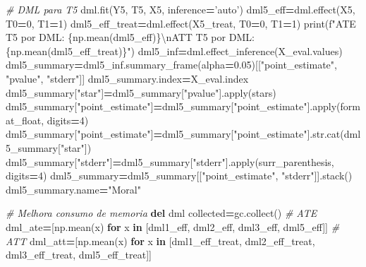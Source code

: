 \documentclass[
]{article}
\newenvironment{Shaded}{\begin{snugshade}}{\end{snugshade}}
\newcommand{\BuiltInTok}[1]{#1}
\newcommand{\CharTok}[1]{\textcolor[rgb]{0.31,0.60,0.02}{#1}}
\newcommand{\CommentTok}[1]{\textcolor[rgb]{0.56,0.35,0.01}{\textit{#1}}}
\newcommand{\ControlFlowTok}[1]{\textcolor[rgb]{0.13,0.29,0.53}{\textbf{#1}}}
\newcommand{\DecValTok}[1]{\textcolor[rgb]{0.00,0.00,0.81}{#1}}
\newcommand{\FloatTok}[1]{\textcolor[rgb]{0.00,0.00,0.81}{#1}}
\newcommand{\KeywordTok}[1]{\textcolor[rgb]{0.13,0.29,0.53}{\textbf{#1}}}
\newcommand{\NormalTok}[1]{#1}
\newcommand{\OperatorTok}[1]{\textcolor[rgb]{0.81,0.36,0.00}{\textbf{#1}}}
\newcommand{\SpecialCharTok}[1]{\textcolor[rgb]{0.00,0.00,0.00}{#1}}
\newcommand{\SpecialStringTok}[1]{\textcolor[rgb]{0.31,0.60,0.02}{#1}}
\newcommand{\StringTok}[1]{\textcolor[rgb]{0.31,0.60,0.02}{#1}}
\begin{document}
\begin{Shaded}
\begin{Highlighting}[]
{\CommentTok{# DML para T5}
\NormalTok{dml.fit(Y5, T5, X5, inference}\OperatorTok{=}\StringTok{'auto'}\NormalTok{)}
\NormalTok{dml5_eff}\OperatorTok{=}\NormalTok{dml.effect(X5, T0}\OperatorTok{=}\DecValTok{0}\NormalTok{, T1}\OperatorTok{=}\DecValTok{1}\NormalTok{)}
\NormalTok{dml5_eff_treat}\OperatorTok{=}\NormalTok{dml.effect(X5_treat, T0}\OperatorTok{=}\DecValTok{0}\NormalTok{, T1}\OperatorTok{=}\DecValTok{1}\NormalTok{)}
\BuiltInTok{print}\NormalTok{(}\SpecialStringTok{f"ATE T5 por DML: }\SpecialCharTok{\{np.}\NormalTok{mean(dml5_eff)}\SpecialCharTok{\}}\CharTok{\textbackslash{}n}\SpecialStringTok{ATT T5 por DML: }\SpecialCharTok{\{np.}\NormalTok{mean(dml5_eff_treat)}\SpecialCharTok{\}}\SpecialStringTok{"}\NormalTok{)}
\NormalTok{dml5_inf}\OperatorTok{=}\NormalTok{dml.effect_inference(X_eval.values)}
\NormalTok{dml5_summary}\OperatorTok{=}\NormalTok{dml5_inf.summary_frame(alpha}\OperatorTok{=}\FloatTok{0.05}\NormalTok{)[[}\StringTok{"point_estimate"}\NormalTok{, }\StringTok{"pvalue"}\NormalTok{, }\StringTok{"stderr"}\NormalTok{]]}
\NormalTok{dml5_summary.index}\OperatorTok{=}\NormalTok{X_eval.index}
\NormalTok{dml5_summary[}\StringTok{"star"}\NormalTok{]}\OperatorTok{=}\NormalTok{dml5_summary[}\StringTok{"pvalue"}\NormalTok{].}\BuiltInTok{apply}\NormalTok{(stars)}
\NormalTok{dml5_summary[}\StringTok{"point_estimate"}\NormalTok{]}\OperatorTok{=}\NormalTok{dml5_summary[}\StringTok{"point_estimate"}\NormalTok{].}\BuiltInTok{apply}\NormalTok{(format_float, digits}\OperatorTok{=}\DecValTok{4}\NormalTok{)}
\NormalTok{dml5_summary[}\StringTok{"point_estimate"}\NormalTok{]}\OperatorTok{=}\NormalTok{dml5_summary[}\StringTok{"point_estimate"}\NormalTok{].}\BuiltInTok{str}\NormalTok{.cat(dml5_summary[}\StringTok{"star"}\NormalTok{])}
\NormalTok{dml5_summary[}\StringTok{"stderr"}\NormalTok{]}\OperatorTok{=}\NormalTok{dml5_summary[}\StringTok{"stderr"}\NormalTok{].}\BuiltInTok{apply}\NormalTok{(surr_parenthesis, digits}\OperatorTok{=}\DecValTok{4}\NormalTok{)}
\NormalTok{dml5_summary}\OperatorTok{=}\NormalTok{dml5_summary[[}\StringTok{"point_estimate"}\NormalTok{, }\StringTok{"stderr"}\NormalTok{]].stack()}
\NormalTok{dml5_summary.name}\OperatorTok{=}\StringTok{"Moral"}

\CommentTok{# Melhora consumo de memoria}
\KeywordTok{del}\NormalTok{ dml}
\NormalTok{collected}\OperatorTok{=}\NormalTok{gc.collect()}
\CommentTok{# ATE}
\NormalTok{dml_ate}\OperatorTok{=}\NormalTok{[np.mean(x) }\ControlFlowTok{for}\NormalTok{ x }\KeywordTok{in}\NormalTok{ [dml1_eff, dml2_eff, dml3_eff, dml5_eff]]}
\CommentTok{# ATT}
\NormalTok{dml_att}\OperatorTok{=}\NormalTok{[np.mean(x) }\ControlFlowTok{for}\NormalTok{ x }\KeywordTok{in} 
\NormalTok{    [dml1_eff_treat, dml2_eff_treat, dml3_eff_treat, dml5_eff_treat]]}

}
\end{Highlighting}
\end{Shaded}
\end{document}
